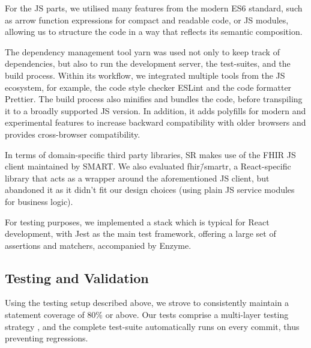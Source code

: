 \documentclass[sigconf]{acmart}
\begin{document}
For the JS parts, we utilised many features from the modern ES6 standard, such as arrow function expressions for compact and readable code, or JS modules, allowing us to structure the code in a way that reflects its semantic composition.

The dependency management tool yarn was used not only to keep track of dependencies, but also to run the development server, the test-suites, and the build process. Within its workflow, we integrated multiple tools from the JS ecosystem, for example, the code style checker ESLint and the code formatter Prettier. %
The build process also minifies and bundles the code, before transpiling it to a broadly supported JS version. In addition, it adds polyfills for modern and experimental features to increase backward compatibility with older browsers and provides cross-browser compatibility.%

In terms of domain-specific third party libraries, SR makes use of the FHIR JS client maintained by SMART. We also evaluated fhir\=/smartr, a React-specific library that acts as a wrapper around the aforementioned JS client, but abandoned it as it didn't fit our design choices %
(using plain JS service modules for business logic).

For testing purposes, we implemented a stack which is typical for React development, with Jest as the main test framework, offering a large set of assertions and matchers, accompanied by Enzyme.%


\subsection{Testing and Validation}
\label{sec:testing}

Using the testing setup described above, we strove to consistently maintain a statement coverage of 80\% or above. Our tests comprise a multi-layer testing strategy %
, and the complete test-suite automatically runs on every commit, thus preventing regressions.
\end{document}
